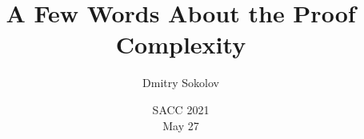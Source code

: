 

\titlegraphic{
    
}


\title[Proof Complexity]{
    A Few Words About the Proof Complexity
}

\author{
    Dmitry Sokolov
}  


\date{SACC 2021\\ May 27}

\newcommand{\SPCR}{\PrSys{S}\text{-}\PrSys{PCR}}
\newcommand{\SSOS}{\PrSys{S}\text{-}\PrSys{SOS}}




    \maketitle

    
%    
%    
%    
    

